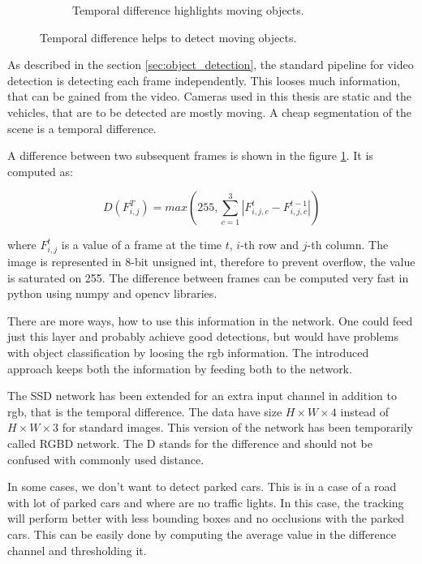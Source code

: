 \documentclass[a4paper,12pt,titlepage, twoside]{article}
\numberwithin{figure}{section}
\begin{document}
\begin{figure}
\begin{subfigure}[Sample1]{0.5\linewidth}
        \caption{Temporal difference highlights moving objects.}   
        \label{fig:td_black}
    \end{subfigure}
    \caption{Temporal difference helps to detect moving objects.}
    \label{fig:td}
\end{figure}

As described in the section \ref{sec:object_detection}, the standard pipeline for video detection is detecting each frame independently. This looses much information, that can be gained from the video. Cameras used in this thesis are static and the vehicles, that are to be detected are mostly moving. A cheap segmentation of the scene is a temporal difference. 

A difference between two subsequent frames is shown in the figure \ref{fig:td_black}. It is computed as:

\begin{equation}
D(F^{T}_{i, j}) = max(255, \sum_{c = 1}^3 |F^t_{i, j, c} - F^{t-1}_{i, j, c}|)
\end{equation}

where $F_{i, j}^t$ is a value of a frame at the time $t$, $i$-th row and $j$-th column. The image is represented in 8-bit unsigned int, therefore to prevent overflow, the value is saturated on 255. The difference between frames can be computed very fast in python using numpy\cite{walt2011numpy} and opencv\cite{opencv} libraries. 

There are more ways, how to use this information in the network. One could feed just this layer and probably achieve good detections, but would have problems with object classification by loosing the rgb information. The introduced approach keeps both the information by feeding both to the network.

The SSD network has been extended for an extra input channel in addition to rgb, that is the temporal difference. The data have size $H \times W \times 4$ instead of $H \times W \times 3$ for standard images. This version of the network has been temporarily called RGBD network. The D stands for the difference and should not be confused with commonly used distance.

In some cases, we don't want to detect parked cars. This is in a case of a road with lot of parked cars and where are no traffic lights. In this case, the tracking will perform better with less bounding boxes and no occlusions with the parked cars. This can be easily done by computing the average value in the difference channel and thresholding it.
\end{document}

